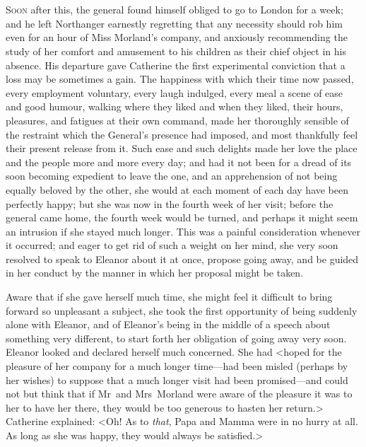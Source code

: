 \chapter[Chapter \thechapter]{} 

 \lettrine{S}{oon} after this, the general found himself obliged to go to London for a week; and he left Northanger earnestly regretting that any necessity should rob him even for an hour of Miss Morland's company, and anxiously recommending the study of her comfort and amusement to his children as their chief object in his absence. His departure gave Catherine the first experimental conviction that a loss may be sometimes a gain. The happiness with which their time now passed, every employment voluntary, every laugh indulged, every meal a scene of ease and good humour, walking where they liked and when they liked, their hours, pleasures, and fatigues at their own command, made her thoroughly sensible of the restraint which the General's presence had imposed, and most thankfully feel their present release from it. Such ease and such delights made her love the place and the people more and more every day; and had it not been for a dread of its soon becoming expedient to leave the one, and an apprehension of not being equally beloved by the other, she would at each moment of each day have been perfectly happy; but she was now in the fourth week of her visit; before the general came home, the fourth week would be turned, and perhaps it might seem an intrusion if she stayed much longer. This was a painful consideration whenever it occurred; and eager to get rid of such a weight on her mind, she very soon resolved to speak to Eleanor about it at once, propose going away, and be guided in her conduct by the manner in which her proposal might be taken. 

 Aware that if she gave herself much time, she might feel it difficult to bring forward so unpleasant a subject, she took the first opportunity of being suddenly alone with Eleanor, and of Eleanor's being in the middle of a speech about something very different, to start forth her obligation of going away very soon. Eleanor looked and declared herself much concerned. She had <hoped for the pleasure of her company for a much longer time—had been misled (perhaps by her wishes) to suppose that a much longer visit had been promised—and could not but think that if Mr~and Mrs~Morland were aware of the pleasure it was to her to have her there, they would be too generous to hasten her return.> Catherine explained: <Oh! As to \textit{that}, Papa and Mamma were in no hurry at all. As long as she was happy, they would always be satisfied.> 

